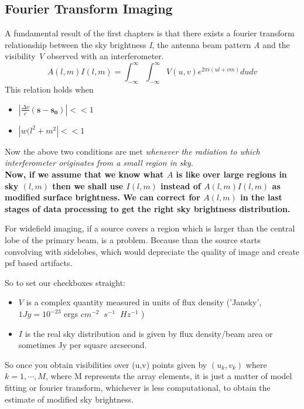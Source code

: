 \documentclass[10pt]{report}
\newcommand{\mbf}[1]{\mathbf{#1}}
\newcommand{\tbf}[1]{\textbf{#1}}
\newcommand{\tit}[1]{\textit{#1}}
\newcommand{\cbox}{tcolorbox}
\newcommand{\cc}[1]{\left({#1}\right)}
\begin{document}
\subsection{Fourier Transform Imaging}
A fundamental result of the first chapters is that there exists a fourier transform relationship between the sky brightness \tit{I}, the antenna beam pattern \tit{A} and the visibility \tit{V} observed with an interferometer.
\begin{equation}\label{eq:modI}
A(l,m)I(l,m)=\int^\infty _{-\infty} \int^\infty _{-\infty} V(u,v) e^{2 \pi i(ul+vm)}du dv
\end{equation}
This relation holds when
\begin{itemize}
\item $|\frac{\Delta \nu}{c}\cc{\mbf{s-s_0}}|<<1$
\item $|w(l^2+m^2|<<1$
\end{itemize}
Now the above two conditions are met \tit{whenever the radiation to which interferometer originates from a small region in sky.}\\

\tbf{Now, if we assume that we know what $A$ is like over large regions in sky $(l,m)$ then we shall use $I(l,m)$ instead of $A(l,m)I(l,m)$ as modified surface brightness. We can correct for $A(l,m)$ in the last stages of data processing to get the right sky brightness distribution.}\\

\begin{\cbox}
For widefield imaging, if a source covers a region which is larger than the central lobe of the primary beam, is a problem. Because than the source starts convolving with sidelobes, which would depreciate the quality of image and create psf based artifacts.
\end{\cbox}

So to set our checkboxes straight:
\begin{itemize}
\item $V$ is a complex quantity measured in units of flux density ('Jansky',$1Jy=10^{-23}$ ergs $cm^{-2} \;\; s^{-1} \;\; Hz^{-1}$ )
\item $I$ is the real sky distribution and is given by flux density/beam area or sometimes Jy per square arcsecond.
\end{itemize}

So once you obtain visibilities over (u,v) points given by $(u_k,v_k)$ where $k=1, \cdots ,M$, where M represents the array elements, it is just a matter of model fitting or fourier transform, whichever is less computational, to obtain the estimate of modified sky brightness.\\
\end{document}
